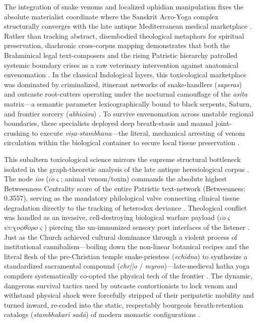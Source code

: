 \documentclass[11pt,letterpaper]{article}
\begin{document}
The integration of snake venoms and localized ophidian manipulation fixes the absolute materialist coordinate where the Sanskrit Acro-Yoga complex structurally converges with the late antique Mediterranean medical marketplace \cite{Hillman2012, McCartneyd, McCartneye}. Rather than tracking abstract, disembodied theological metaphors for spiritual preservation, diachronic cross-corpus mapping demonstrates that both the Brahminical legal text-composers and the rising Patristic hierarchy patrolled systemic boundary crises as a raw veterinary intervention against anatomical envenomation \cite{McCartneyd, McCartneye}. In the classical Indological layers, this toxicological marketplace was dominated by criminalized, itinerant networks of snake-handlers (\textit{saperas}) and outcaste root-cutters operating under the nocturnal camouflage of the \textit{asita} matrix---a semantic parameter lexicographically bound to black serpents, Saturn, and frontier sorcery (\textit{abhicāra}) \cite{McCartneyd}. To survive envenomation across unstable regional boundaries, these specialists deployed deep breath-stasis and manual joint-crushing to execute \textit{viṣa-stambhana}---the literal, mechanical arresting of venom circulation within the biological container to secure local tissue preservation \cite{Birch2024, McCartneyd}.

This subaltern toxicological science mirrors the supreme structural bottleneck isolated in the graph-theoretic analysis of the late antique heresiological corpus \cite{McCartneye}. The node \textit{ios} ($\iota\acute{o}\varsigma$; animal venom/toxin) commands the absolute highest Betweenness Centrality score of the entire Patristic text-network (Betweenness: 0.3557), serving as the mandatory philological valve connecting clinical tissue degradation directly to the tracking of heterodox deviance \cite{McCartneye}. Theological conflict was handled as an invasive, cell-destroying biological warfare payload ($\iota\grave{o}\varsigma$ $\psi\upsilon\chi o\phi\theta\acute{o}\rho o\varsigma$) piercing the un-immunized sensory port interfaces of the listener \cite{McCartneye}. Just as the Church achieved cultural dominance through a violent process of institutional cannibalism---boiling down the non-linear botanical recipes and the literal flesh of the pre-Christian temple snake-priestess (\textit{echidna}) to synthesize a standardized sacramental compound (\textit{chr\bar{\imath}\bar{o}} / \textit{myron})---late-medieval hatha yoga compilers systematically co-opted the physical tech of the frontier \cite{Birch2024, McCartneye}. The dynamic, dangerous survival tactics used by outcaste contortionists to lock venom and withstand physical shock were forcefully stripped of their peripatetic mobility and turned inward, re-coded into the static, respectably bourgeois breath-retention catalogs (\textit{stambhakarī sadā}) of modern monastic configurations \cite{Birch2024, McCartneyd}.
\end{document}
